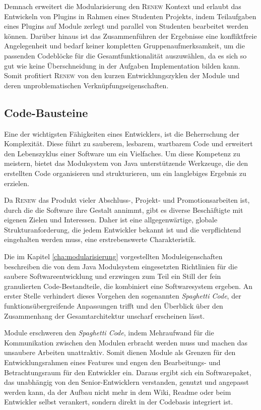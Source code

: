 		Demnach erweitert die Modularisierung den \textsc{Renew} Kontext und erlaubt das Entwickeln von Plugins in Rahmen eines Studenten Projekts, indem Teilaufgaben eines Plugins auf Module zerlegt und parallel von Studenten bearbeitet werden können. Darüber hinaus ist das Zusammenführen der Ergebnisse eine konfliktfreie Angelegenheit und bedarf keiner kompletten Gruppenaufmerksamkeit, um die passenden Codeblöcke für die Gesamtfunktionalität auszuwählen, da es sich so gut wie keine Überschneidung in der Aufgaben Implementation bilden kann. Somit profitiert \textsc{Renew} von den kurzen Entwicklungszyklen der Module und deren unproblematischen Verknüpfungseigenschaften. 

	\subsection{Code-Bausteine}\label{sub:cbs}
		Eine der wichtigsten Fähigkeiten eines Entwicklers, ist die Beherrschung der Komplexität. Diese führt zu sauberem, lesbarem, wartbarem Code und erweitert den Lebenszyklus einer Software um ein Vielfaches. Um diese Kompetenz zu meistern, bietet das Modulsystem von Java unterstützende Werkzeuge, die den erstellten Code organisieren und strukturieren, um ein langlebiges Ergebnis zu erzielen.\bigbreak

		Da \textsc{Renew} das Produkt vieler Abschluss-, Projekt- und Promotionsarbeiten ist, durch die die Software ihre Gestalt annimmt, gibt es diverse Beschäftigte mit eigenen Zielen und Interessen. Daher ist eine allgegenwärtige, globale Strukturanforderung, die jedem Entwickler bekannt ist und die verpflichtend eingehalten werden muss, eine erstrebenswerte Charakteristik.\bigbreak

		Die im Kapitel \ref{cha:modularisierung} vorgestellten Moduleigenschaften beschreiben die von dem Java Modulsystem eingesetzten Richtlinien für die saubere Softwareentwicklung und erzwingen zum Teil ein Still der fein granulierten Code-Bestandteile, die kombiniert eine Softwaresystem ergeben. \newline
		An erster Stelle verhindert dieses Vorgehen den sogenannten \textit{Spaghetti Code}, der funktionsübergreifende Anpassungen trifft und den Überblick über den Zusammenhang der Gesamtarchitektur unscharf erscheinen lässt. \bigbreak

		Module erschweren den \textit{Spaghetti Code}, indem Mehraufwand für die Kommunikation zwischen den Modulen erbracht werden muss und machen das unsaubere Arbeiten unattraktiv. Somit dienen Module als Grenzen für den Entwicklungsrahmen eines Features und engen den Bearbeitungs- und Betrachtungsraum für den Entwickler ein. Daraus ergibt sich ein Softwarepaket, das unabhängig von den Senior-Entwicklern verstanden, genutzt und angepasst werden kann, da der Aufbau nicht mehr in dem Wiki, Readme oder beim Entwickler selbst verankert, sondern direkt in der Codebasis integriert ist.\bigbreak

